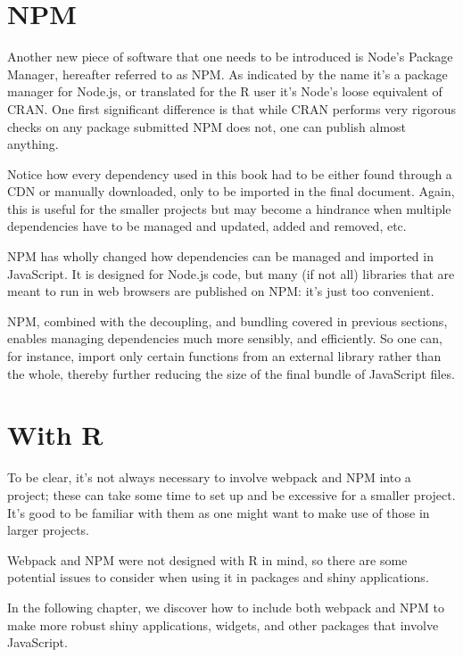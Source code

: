 \documentclass[10pt,]{krantz}
\begin{document}
\hypertarget{webpack-npm}{%
\section{NPM}\label{webpack-npm}}

Another new piece of software that one needs to be introduced is Node's Package Manager, hereafter referred to as NPM. As indicated by the name it's a package manager for Node.js, or translated for the R user it's Node's loose equivalent of CRAN. One first significant difference is that while CRAN performs very rigorous checks on any package submitted NPM does not, one can publish almost anything.

Notice how every dependency used in this book had to be either found through a CDN or manually downloaded, only to be imported in the final document. Again, this is useful for the smaller projects but may become a hindrance when multiple dependencies have to be managed and updated, added and removed, etc.

NPM has wholly changed how dependencies can be managed and imported in JavaScript. It is designed for Node.js code, but many (if not all) libraries that are meant to run in web browsers are published on NPM: it's just too convenient.

NPM, combined with the decoupling, and bundling covered in previous sections, enables managing dependencies much more sensibly, and efficiently. So one can, for instance, import only certain functions from an external library rather than the whole, thereby further reducing the size of the final bundle of JavaScript files.

\hypertarget{webpack-conclude}{%
\section{With R}\label{webpack-conclude}}

To be clear, it's not always necessary to involve webpack and NPM into a project; these can take some time to set up and be excessive for a smaller project. It's good to be familiar with them as one might want to make use of those in larger projects.

Webpack and NPM were not designed with R in mind, so there are some potential issues to consider when using it in packages and shiny applications.

In the following chapter, we discover how to include both webpack and NPM to make more robust shiny applications, widgets, and other packages that involve JavaScript.
\end{document}
